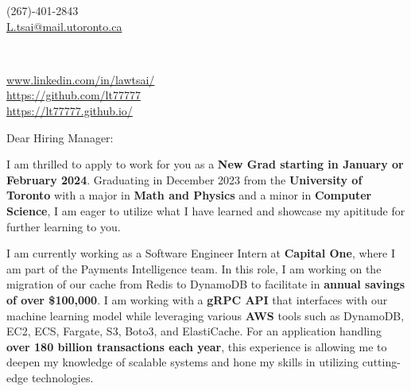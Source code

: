 \documentclass[10.5pt,a4]{article}
\begin{document}
\begin{center}
    \begin{minipage}[b]{0.24\textwidth}
            \large (267)-401-2843 \\
            \large \href{mailto:L.tsai@mail.utoronto.ca}{L.tsai@mail.utoronto.ca} 
    \end{minipage}%
    \begin{minipage}[b]{0.5\textwidth}
             \\ %
            \vspace{0.1cm}
            {\color{UI_blue} \Large{}}
    \end{minipage}%
    \begin{minipage}[b]{0.33\textwidth}
            \flushright \small
            {\href{www.linkedin.com/in/lawtsai/}{www.linkedin.com/in/lawtsai/} } \\
            \href{https://github.com/lt77777}{https://github.com/lt77777} \\
            \href{https://lt77777.github.io/}
            {https://lt77777.github.io/}
    \end{minipage}   
    
\vspace{-0.15cm} 
{\color{UI_blue} \hrulefill}
\end{center}

\justify
\setlength{\parindent}{0pt}
\setlength{\parskip}{12pt}
\vspace{0.2cm}




Dear Hiring Manager:

I am thrilled to apply to work for you as a \textbf{New Grad starting in January or February 2024}. Graduating in December 2023 from the \textbf{University of Toronto} with a major in \textbf{Math and Physics} and a minor in \textbf{Computer Science}, I am eager to utilize what I have learned and showcase my apititude for further learning to you.

I am currently working as a Software Engineer Intern at \textbf{Capital One}, where I am part of the Payments Intelligence team. In this role, I am working on the migration of our cache from Redis to DynamoDB to facilitate in \textbf{annual savings of over \$100,000}. I am working with a \textbf{gRPC API} that interfaces with our machine learning model while leveraging various \textbf{AWS} tools such as DynamoDB, EC2, ECS, Fargate, S3, Boto3, and ElastiCache. For an application handling \textbf{over 180 billion transactions each year}, this experience is allowing me to deepen my knowledge of scalable systems and hone my skills in utilizing cutting-edge technologies.
\end{document}
